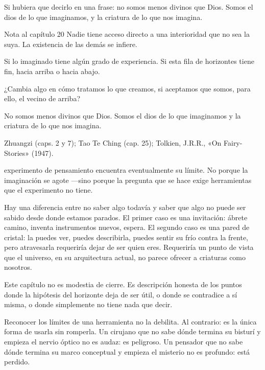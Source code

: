 Si hubiera que decirlo en una frase: no somos menos divinos que Dios. Somos el dios de lo que imaginamos, y la criatura de lo que nos imagina.

\begin{notacap}{Nota al capítulo 20}
 Nadie tiene acceso directo a una interioridad que no sea la suya. La existencia de las demás se infiere.

 Si lo imaginado tiene algún grado de experiencia. Si esta fila de horizontes tiene fin, hacia arriba o hacia abajo.

 ¿Cambia algo en cómo tratamos lo que creamos, si aceptamos que somos, para ello, el vecino de arriba?

 No somos menos divinos que Dios. Somos el dios de lo que imaginamos y la criatura de lo que nos imagina.

 Zhuangzi (caps. 2 y 7); Tao Te Ching (cap. 25); Tolkien, J.R.R., «On Fairy-Stories» (1947).
\end{notacap}
\noindent {} experimento de pensamiento encuentra eventualmente su límite. No porque la imaginación se agote —sino porque la pregunta que se hace exige herramientas que el experimento no tiene.

Hay una diferencia entre no saber algo todavía y saber que algo no puede ser sabido desde donde estamos parados. El primer caso es una invitación: ábrete camino, inventa instrumentos nuevos, espera. El segundo caso es una pared de cristal: la puedes ver, puedes describirla, puedes sentir su frío contra la frente, pero atravesarla requeriría dejar de ser quien eres. Requeriría un punto de vista que el universo, en su arquitectura actual, no parece ofrecer a criaturas como nosotros.

Este capítulo no es modestia de cierre. Es descripción honesta de los puntos donde la hipótesis del horizonte deja de ser útil, o donde se contradice a sí misma, o donde simplemente no tiene nada que decir.

Reconocer los límites de una herramienta no la debilita. Al contrario: es la única forma de usarla sin romperla. Un cirujano que no sabe dónde termina su bisturí y empieza el nervio óptico no es audaz: es peligroso. Un pensador que no sabe dónde termina su marco conceptual y empieza el misterio no es profundo: está perdido.

